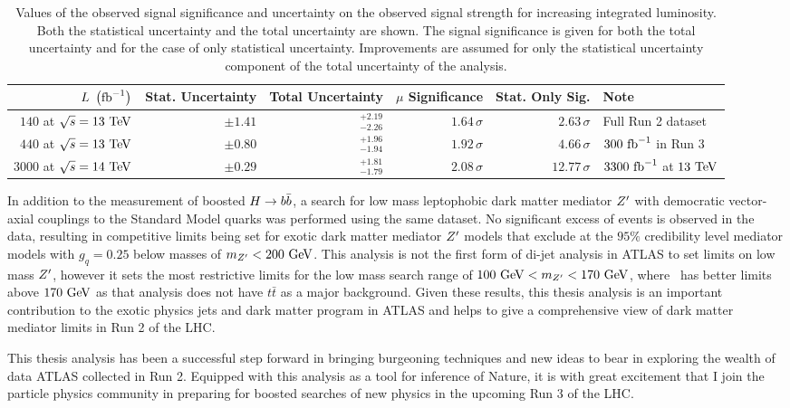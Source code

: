 \begin{table}[htbp]
 \centering
 \caption[Values of the observed signal significance and uncertainty on the observed signal strength for increasing integrated luminosity.]{%
  Values of the observed signal significance and uncertainty on the observed signal strength for increasing integrated luminosity.
  Both the statistical uncertainty and the total uncertainty are shown.
  The signal significance is given for both the total uncertainty and for the case of only statistical uncertainty.
  Improvements are assumed for only the statistical uncertainty component of the total uncertainty of the analysis.}
 \label{table:signal_significance_lumi_scaling}
 \begin{adjustbox}{max width=\textwidth}
  \begin{tabular}{@{}rrrrrl@{}} \toprule
   $L~\left(\mathrm{fb}^{-1}\right)$        & Stat. Uncertainty & Total Uncertainty  & $\mu$ Significance & Stat. Only Sig. & Note                     \\ \midrule
   $140$ at $\sqrt{s}=13~\mathrm{TeV}$  & $\pm1.41$         & $_{-2.26}^{+2.19}$ & $1.64\,\sigma$     & $2.63\,\sigma$  & Full Run 2 dataset       \\
   $440$ at $\sqrt{s}=13~\mathrm{TeV}$  & $\pm0.80$         & $_{-1.94}^{+1.96}$ & $1.92\,\sigma$     & $4.66\,\sigma$  & $300~\mathrm{fb}^{-1}$ in Run 3      \\
   $3000$ at $\sqrt{s}=14~\mathrm{TeV}$ & $\pm0.29$         & $_{-1.79}^{+1.81}$ & $2.08\,\sigma$     & $12.77\,\sigma$ & $3300~\mathrm{fb}^{-1}$ at $13~\mathrm{TeV}$ \\
   \bottomrule
  \end{tabular}
 \end{adjustbox}
\end{table}

In addition to the measurement of boosted $H \to b\bar{b}$, a search for low mass leptophobic dark matter mediator $Z^{\prime}$ with democratic vector-axial couplings to the Standard Model quarks was performed using the same dataset.
No significant excess of events is observed in the data, resulting in competitive limits being set for exotic dark matter mediator $Z^{\prime}$ models that exclude at the $95\%$ credibility level mediator models with $g_{q} = 0.25$ below masses of $m_{Z^{\prime}} < 200~\mathrm{GeV}$.
This analysis is not the first form of di-jet analysis in ATLAS to set limits on low mass $Z^{\prime}$, however it sets the most restrictive limits for the low mass search range of $100~\mathrm{GeV} < m_{Z^{\prime}} <170~\mathrm{GeV}$, where~\cite{EXOT-2017-01} has better limits above $170~\mathrm{GeV}$ as that analysis does not have $t\bar{t}$ as a major background.
Given these results, this thesis analysis is an important contribution to the exotic physics jets and dark matter program in ATLAS and helps to give a comprehensive view of dark matter mediator limits in Run 2 of the LHC.

This thesis analysis has been a successful step forward in bringing burgeoning techniques and new ideas to bear in exploring the wealth of data ATLAS collected in Run 2.
Equipped with this analysis as a tool for inference of Nature, it is with great excitement that I join the particle physics community in preparing for boosted searches of new physics in the upcoming Run 3 of the LHC.
